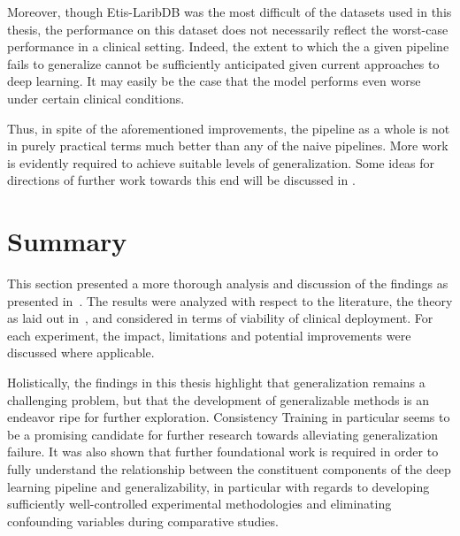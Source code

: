 Moreover, though Etis-LaribDB was the most difficult of the datasets used in this thesis, the performance on this dataset does not necessarily reflect the worst-case performance in a clinical setting. Indeed, the extent to which the a given pipeline fails to generalize cannot be sufficiently anticipated \cite{trust_ai} given current approaches to deep learning. It may easily be the case that the model performs even worse under certain clinical conditions.

Thus, in spite of the aforementioned improvements, the pipeline as a whole is not in purely practical terms much better than any of the naive pipelines. More work is evidently required to achieve suitable levels of generalization. Some ideas for directions of further work towards this end will be discussed in . 

\section{Summary}
This section presented a more thorough analysis and discussion of the findings as presented in~. The results were analyzed with respect to the literature, the theory as laid out in~, and considered in terms of viability of clinical deployment. For each experiment, the impact, limitations and potential improvements were discussed where applicable. 

Holistically, the findings in this thesis highlight that generalization remains a challenging problem, but that the development of generalizable methods is an endeavor ripe for further exploration. Consistency Training in particular seems to be a promising candidate for further research towards alleviating generalization failure. It was also shown that further foundational work is required in order to fully understand the relationship between the constituent components of the deep learning pipeline and generalizability, in particular with regards to developing sufficiently well-controlled experimental methodologies and eliminating confounding variables during comparative studies. 